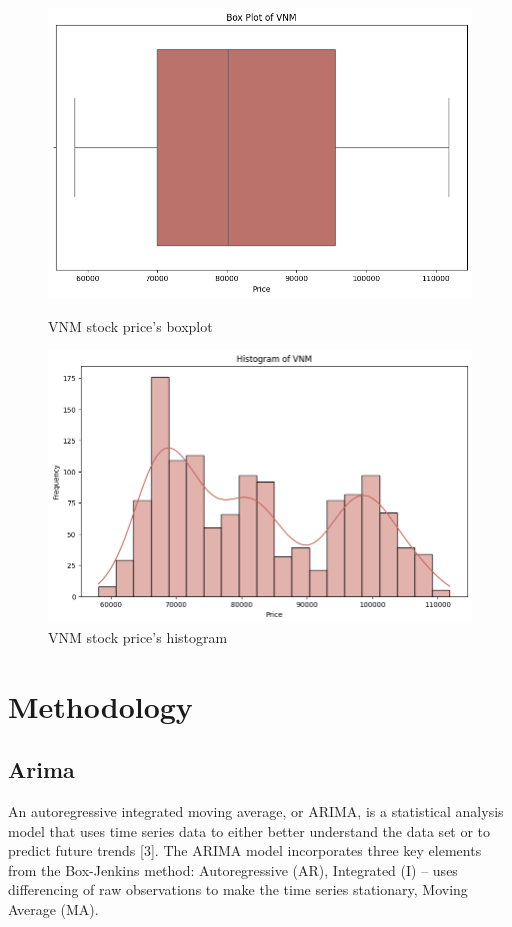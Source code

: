 \documentclass{ieeeojies}
\begin{document}
\begin{figure}[H]
    \centering
    \begin{minipage}{0.23\textwidth}
    \centering
    \includegraphics[width=1\textwidth]{BoxPlotOfVNM.png}
    \caption{VNM stock price's boxplot}
    \label{fig:1}
    \end{minipage}
    \hfill
    \begin{minipage}{0.23\textwidth}
    \centering
    \includegraphics[width=1\textwidth]{HistogramOfVNM.png}
    \caption{VNM stock price's histogram}
    \label{fig:2}
    \end{minipage}
\end{figure}

\section{Methodology}
\subsection{Arima}
\indent An autoregressive integrated moving average, or ARIMA, is a statistical analysis model that uses time series data to either better understand the data set or to predict future trends [3]. The ARIMA model incorporates three key elements from the Box-Jenkins method: Autoregressive (AR), Integrated (I) – uses differencing of raw observations to make the time series stationary, Moving Average (MA).
\end{document}

